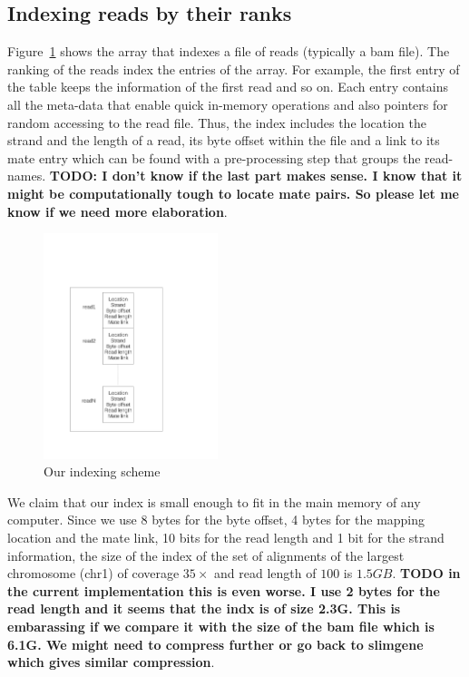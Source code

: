 \documentclass[10pt,fullpage]{article}
\newcommand{\fref}[1]{\mbox{Figure~\ref{#1}}}
\begin{document}
\subsection{Indexing reads by their ranks}
\label{sec:indx}
\fref{fig:indx-descr} shows the array that indexes a file of
reads (typically a bam file). The ranking of the reads index the entries of the array. 
For example, the first entry of the table keeps the information of the
first read and so on. Each entry contains all the meta-data that
enable quick in-memory operations and also pointers for random
accessing to the read file. Thus, the index includes the location the
strand and the length of a read, its byte offset within the file and
a link to its mate entry which can be found with a pre-processing
step that groups the read-names. {\bf TODO: I don't know if the last
part makes sense. I know that it might be computationally tough to
locate mate pairs. So please let me know if we need more elaboration}.

\begin{figure}[hbt]
  \centering
  \includegraphics[trim = 30mm 30mm 60mm 40mm,
  clip,width=2in]{fig/indx_descr.pdf}
  \caption{{\footnotesize Our indexing scheme }}
  \label{fig:indx-descr}
\end{figure}


We claim that our index is small enough to fit in the main memory of
any computer. Since we use 8 bytes for the byte offset, 4 bytes for
the mapping location and the mate link, 10 bits for the read length
and 1 bit for the strand information, the size of the index of the set of
alignments of the largest chromosome (chr1) of coverage $35\times$ and
read length of $100$ is $1.5GB$. {\bf TODO in the current
implementation this is even worse. I use 2 bytes for the read length
and it seems that the indx is of size 2.3G. This is embarassing if we
compare it with the size of the bam file which is 6.1G. We might need
to compress further or go back to slimgene which gives similar
compression}.
\end{document}
